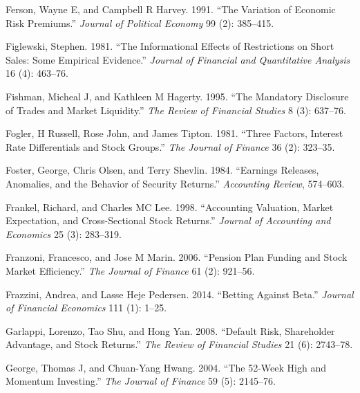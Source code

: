 \documentclass[
  letterpaper,
  DIV=11,
  numbers=noendperiod]{scrreprt}
\newlength{\cslhangindent}
\newlength{\cslentryspacingunit} %
\newenvironment{CSLReferences}[2] %
 {%
  \setlength{\parindent}{0pt}
  \ifodd #1
  \let\oldpar\par
  \def\par{\hangindent=\cslhangindent\oldpar}
  \fi
  \setlength{\parskip}{#2\cslentryspacingunit}
 }%
 {}
\begin{document}
\begin{CSLReferences}{1}{0}
\leavevmode{}%
Ferson, Wayne E, and Campbell R Harvey. 1991. {``The Variation of
Economic Risk Premiums.''} \emph{Journal of Political Economy} 99 (2):
385--415.

\leavevmode{}%
Figlewski, Stephen. 1981. {``The Informational Effects of Restrictions
on Short Sales: Some Empirical Evidence.''} \emph{Journal of Financial
and Quantitative Analysis} 16 (4): 463--76.

\leavevmode{}%
Fishman, Micheal J, and Kathleen M Hagerty. 1995. {``The Mandatory
Disclosure of Trades and Market Liquidity.''} \emph{The Review of
Financial Studies} 8 (3): 637--76.

\leavevmode{}%
Fogler, H Russell, Rose John, and James Tipton. 1981. {``Three Factors,
Interest Rate Differentials and Stock Groups.''} \emph{The Journal of
Finance} 36 (2): 323--35.

\leavevmode{}%
Foster, George, Chris Olsen, and Terry Shevlin. 1984. {``Earnings
Releases, Anomalies, and the Behavior of Security Returns.''}
\emph{Accounting Review}, 574--603.

\leavevmode{}%
Frankel, Richard, and Charles MC Lee. 1998. {``Accounting Valuation,
Market Expectation, and Cross-Sectional Stock Returns.''} \emph{Journal
of Accounting and Economics} 25 (3): 283--319.

\leavevmode{}%
Franzoni, Francesco, and Jose M Marin. 2006. {``Pension Plan Funding and
Stock Market Efficiency.''} \emph{The Journal of Finance} 61 (2):
921--56.

\leavevmode{}%
Frazzini, Andrea, and Lasse Heje Pedersen. 2014. {``Betting Against
Beta.''} \emph{Journal of Financial Economics} 111 (1): 1--25.

\leavevmode{}%
Garlappi, Lorenzo, Tao Shu, and Hong Yan. 2008. {``Default Risk,
Shareholder Advantage, and Stock Returns.''} \emph{The Review of
Financial Studies} 21 (6): 2743--78.

\leavevmode{}%
George, Thomas J, and Chuan-Yang Hwang. 2004. {``The 52-Week High and
Momentum Investing.''} \emph{The Journal of Finance} 59 (5): 2145--76.


\end{CSLReferences}
\end{document}
